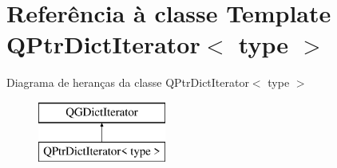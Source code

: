 \hypertarget{class_q_ptr_dict_iterator}{\section{Referência à classe Template Q\-Ptr\-Dict\-Iterator$<$ type $>$}
\label{class_q_ptr_dict_iterator}
}
Diagrama de heranças da classe Q\-Ptr\-Dict\-Iterator$<$ type $>$\begin{figure}[H]
\begin{center}
\leavevmode
\includegraphics[height=2.000000cm]{class_q_ptr_dict_iterator}
\end{center}
\end{figure}
